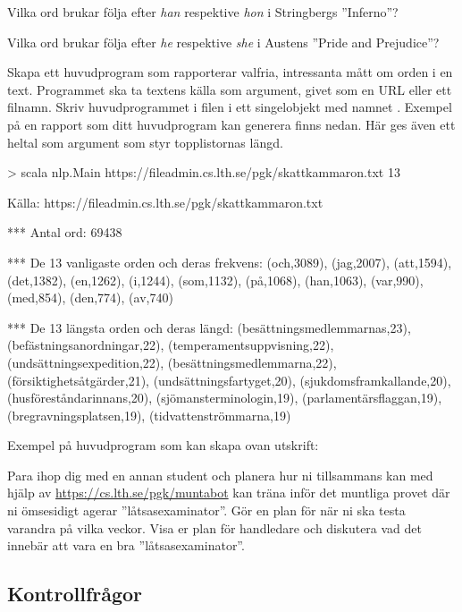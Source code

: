 \Subtask Vilka ord brukar följa efter \emph{han} respektive \emph{hon} i Stringbergs ''Inferno''?

\Subtask Vilka ord brukar följa efter \emph{he} respektive \emph{she} i Austens ''Pride and Prejudice''?


\Task Skapa ett huvudprogram som rapporterar valfria, intressanta mått om orden i en text. Programmet ska ta textens källa som argument, givet som en URL eller ett filnamn. Skriv huvudprogrammet i filen  i ett singelobjekt med namnet . Exempel på en rapport som ditt huvudprogram kan generera finns nedan. Här ges även ett heltal som argument som styr topplistornas längd.
\begin{REPL}
> scala nlp.Main https://fileadmin.cs.lth.se/pgk/skattkammaron.txt 13

Källa: https://fileadmin.cs.lth.se/pgk/skattkammaron.txt

*** Antal ord: 69438

*** De 13 vanligaste orden och deras frekvens:
(och,3089), (jag,2007), (att,1594), (det,1382), (en,1262),
(i,1244), (som,1132), (på,1068), (han,1063), (var,990),
(med,854), (den,774), (av,740)

*** De 13 längsta orden och deras längd:
(besättningsmedlemmarnas,23), (befästningsanordningar,22),
(temperamentsuppvisning,22), (undsättningsexpedition,22),
(besättningsmedlemmarna,22), (försiktighetsåtgärder,21),
(undsättningsfartyget,20), (sjukdomsframkallande,20),
(husföreståndarinnans,20), (sjömansterminologin,19),
(parlamentärsflaggan,19), (bregravningsplatsen,19),
(tidvattenströmmarna,19)
\end{REPL}

\noindent Exempel på huvudprogram som kan skapa ovan utskrift:

\Task Para ihop dig med en annan student och planera hur ni tillsammans kan med hjälp av \url{https://cs.lth.se/pgk/muntabot} kan träna inför det muntliga provet där ni ömsesidigt agerar ''låtsasexaminator''. Gör en plan för när ni ska testa varandra på vilka veckor. Visa er plan för handledare och diskutera vad det innebär att vara en bra ''låtsasexaminator''.


\subsection{Kontrollfrågor}\label{words-check}

